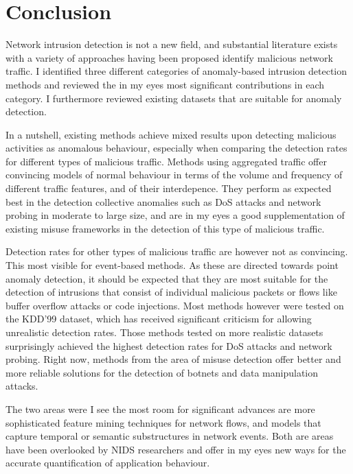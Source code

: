 \documentclass[a4paper,12pt,twoside]{report}
\begin{document}
\section{Conclusion}

Network intrusion detection is not a new field, and substantial literature exists with a variety of approaches having been proposed identify malicious network traffic. I identified three different categories of anomaly-based intrusion detection methods and reviewed the in my eyes most significant contributions in each category. I furthermore reviewed existing datasets that are suitable for anomaly detection. 

In a nutshell, existing methods achieve mixed results upon detecting malicious activities as anomalous behaviour, especially when comparing the detection rates for different types of malicious traffic. Methods using aggregated traffic offer convincing models of normal behaviour in terms of the volume and frequency of different traffic features, and of their interdepence. They perform as expected best in the detection collective anomalies such as DoS attacks and network probing in moderate to large size, and are in my eyes a good supplementation of existing misuse frameworks in the detection of this type of malicious traffic.  

Detection rates for other types of malicious traffic are however not as convincing. This most visible for event-based methods. As these are directed towards point anomaly detection, it should be expected that they are most suitable for the detection of intrusions that consist of individual malicious packets or flows like buffer overflow attacks or code injections. Most methods however were tested on the KDD'99 dataset, which has received significant criticism for allowing unrealistic detection rates. Those methods tested on more realistic datasets surprisingly achieved the highest detection rates for DoS attacks and network probing.  Right now, methods from the area of misuse detection offer better and more reliable solutions for the detection of botnets and data manipulation attacks.

The two areas were I see the most room for significant advances are more sophisticated feature mining techniques for network flows, and models that capture temporal or semantic substructures in network events. Both are areas have been overlooked by NIDS researchers and offer in my eyes new ways for the accurate quantification of application behaviour.

\end{document}
